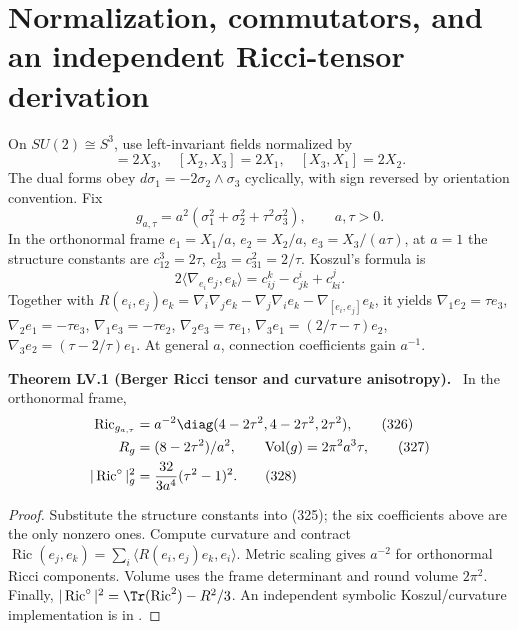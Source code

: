 \documentclass[11pt,a4paper,oneside]{book}
\newcommand{\statement}[3]{\par\medskip\noindent\textbf{#1 #2 (#3).}\ }
\begin{document}
\section{Normalization, commutators, and an independent Ricci-tensor derivation}
On $SU(2)\cong S^3$, use left-invariant fields normalized by
\begin{equation}[X_1,X_2]=2X_3,\quad[X_2,X_3]=2X_1,\quad[X_3,X_1]=2X_2.\tag{323}\end{equation}
The dual forms obey $d\sigma_1=-2\sigma_2\wedge\sigma_3$ cyclically, with sign reversed by orientation convention. Fix
\begin{equation}g_{a,\tau}=a^2(\sigma_1^2+\sigma_2^2+\tau^2\sigma_3^2),\qquad a,\tau>0.\tag{324}\end{equation}
In the orthonormal frame $e_1=X_1/a$, $e_2=X_2/a$, $e_3=X_3/(a\tau)$, at $a=1$ the structure constants are $c^3_{12}=2\tau$, $c^1_{23}=c^2_{31}=2/\tau$. Koszul's formula is
\begin{equation}2\langle\nabla_{e_i}e_j,e_k\rangle=c^k_{ij}-c^i_{jk}+c^j_{ki}.\tag{325}\end{equation}
Together with $R(e_i,e_j)e_k=\nabla_i\nabla_je_k-\nabla_j\nabla_ie_k-\nabla_{[e_i,e_j]}e_k$, it yields $\nabla_1e_2=\tau e_3$, $\nabla_2e_1=-\tau e_3$, $\nabla_1e_3=-\tau e_2$, $\nabla_2e_3=\tau e_1$, $\nabla_3e_1=(2/\tau-\tau)e_2$, $\nabla_3e_2=(\tau-2/\tau)e_1$. At general $a$, connection coefficients gain $a^{-1}$.
\statement{Theorem}{LV.1}{Berger Ricci tensor and curvature anisotropy}
In the orthonormal frame,
\begin{align}\operatorname{Ric}_{g_{a,\tau}}&=a^{-2}\diag(4-2\tau^2,4-2\tau^2,2\tau^2),\tag{326}\\
R_g&=(8-2\tau^2)/a^2,\qquad\operatorname{Vol}(g)=2\pi^2a^3\tau,\tag{327}\\
|\operatorname{Ric}^{\circ}|_g^2&=\frac{32}{3a^4}(\tau^2-1)^2.\tag{328}\end{align}
\begin{proof}
Substitute the structure constants into (325); the six coefficients above are the only nonzero ones. Compute curvature and contract $\operatorname{Ric}(e_j,e_k)=\sum_i\langle R(e_i,e_j)e_k,e_i\rangle$. Metric scaling gives $a^{-2}$ for orthonormal Ricci components. Volume uses the frame determinant and round volume $2\pi^2$. Finally, $|\operatorname{Ric}^\circ|^2=\Tr(\operatorname{Ric}^2)-R^2/3$. An independent symbolic Koszul/curvature implementation is in .
\end{proof}
\end{document}
